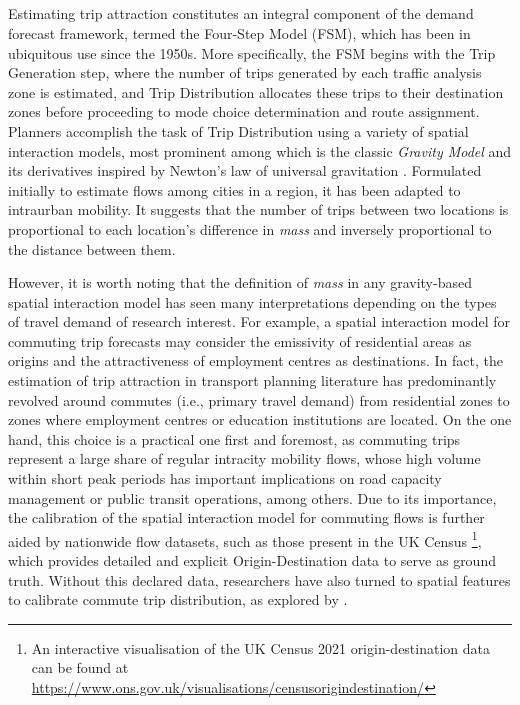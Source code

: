 
\subsection*{}

Estimating trip attraction constitutes an integral component of the demand forecast framework, termed the Four-Step Model (FSM), which has been in ubiquitous use since the 1950s. More specifically, the FSM begins with the Trip Generation step, where the number of trips generated by each traffic analysis zone is estimated, and Trip Distribution allocates these trips to their destination zones before proceeding to mode choice determination and route assignment. Planners accomplish the task of Trip Distribution using a variety of spatial interaction models, most prominent among which is the classic \textit{Gravity Model} and its derivatives inspired by Newton's law of universal gravitation \citep{erlanderGravityModelTransportation1990}. Formulated initially to estimate flows among cities in a region, it has been adapted to intraurban mobility. It suggests that the number of trips between two locations is proportional to each location's difference in \textit{mass} and inversely proportional to the distance between them. 

However, it is worth noting that the definition of \textit{mass} in any gravity-based spatial interaction model has seen many interpretations depending on the types of travel demand of research interest. For example, a spatial interaction model for commuting trip forecasts may consider the emissivity of residential areas as origins and the attractiveness of employment centres as destinations. In fact, the estimation of trip attraction in transport planning literature has predominantly revolved around commutes (i.e., primary travel demand) from residential zones to zones where employment centres or education institutions are located. On the one hand, this choice is a practical one first and foremost, as commuting trips represent a large share of regular intracity mobility flows, whose high volume within short peak periods has important implications on road capacity management or public transit operations, among others. Due to its importance, the calibration of the spatial interaction model for commuting flows is further aided by nationwide flow datasets, such as those present in the UK Census \footnote{An interactive visualisation of the UK Census 2021 origin-destination data can be found at \url{https://www.ons.gov.uk/visualisations/censusorigindestination/}}, which provides detailed and explicit Origin-Destination data to serve as ground truth. Without this declared data, researchers have also turned to spatial features to calibrate commute trip distribution, as explored by \cite{yangLimitsPredictabilityCommuting2014}.

